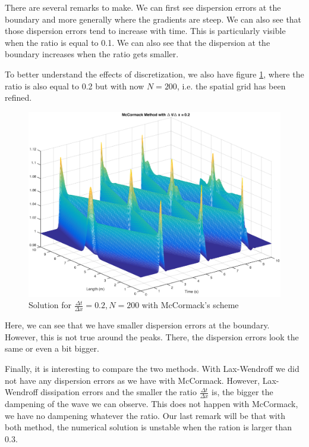 There are several remarks to make. We can first see dispersion errors at the boundary and more generally where the gradients are steep. We can also see that those dispersion errors tend to increase with time. This is particularly visible when the ratio is equal to 0.1. We can also see that the dispersion at the boundary increases when the ratio gets smaller.

To better understand the effects of discretization, we also have figure \ref{mc200}, where the ratio is also equal to 0.2 but with now $N=200$, i.e. the spatial grid has been refined. 
\begin{figure}
\begin{center}
\includegraphics[scale=0.5]{mccormack02200.eps}
\caption{Solution for $\frac{\Delta t}{\Delta x}= 0.2, N=200$ with McCormack's scheme}
\label{mc200}
\end{center}
\end{figure}

Here, we can see that we have smaller dispersion errors at the boundary. However, this is not true around the peaks. There, the dispersion errors look the same or even a bit bigger.

Finally, it is interesting to compare the two methods. With Lax-Wendroff we did not have any dispersion errors as we have with McCormack. However, Lax-Wendroff dissipation errors and the smaller the ratio $\frac{\Delta t}{\Delta x}$ is, the bigger the dampening of the wave we can observe. This does not happen with McCormack, we have no dampening whatever the ratio. Our last remark will be that with both method, the numerical solution is unstable when the ration is larger than 0.3.

